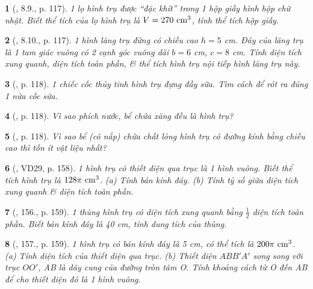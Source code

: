 \documentclass{article}
\newtheorem{baitoan}{}
\begin{document}
\begin{baitoan}[\cite{Binh_boi_duong_Toan_9_tap_2}, 8.9., p. 117]
	1 lọ hình trụ được ``đặc khít'' trong 1 hộp giấy hình hộp chữ nhật. Biết thể tích của lọ hình trụ là $V = 270\ {\rm cm}^3$, tính thể tích hộp giấy.
\end{baitoan}

\begin{baitoan}[\cite{Binh_boi_duong_Toan_9_tap_2}, 8.10., p. 117]
	1 hình lăng trụ đứng có chiều cao $h = 5$ {\rm cm}. Đáy của lăng trụ là 1 tam giác vuông có 2 cạnh góc vuông dài $b = 6$ {\rm cm}, $c = 8$ {\rm cm}. Tính diện tích xung quanh, diện tích toàn phần, \& thể tích hình trụ nội tiếp hình lăng trụ này.
\end{baitoan}

\begin{baitoan}[\cite{Binh_boi_duong_Toan_9_tap_2}, p. 118]
	1 chiếc cốc thủy tinh hình trụ đựng đầy sữa. Tìm cách để rót ra đúng 1 nửa cốc sữa.
\end{baitoan}

\begin{baitoan}[\cite{Binh_boi_duong_Toan_9_tap_2}, p. 118]
	Vì sao phích nước, bể chứa xăng đều là hình trụ?
\end{baitoan}

\begin{baitoan}[\cite{Binh_boi_duong_Toan_9_tap_2}, p. 118]
	Vì sao bể (có nắp) chứa chất lỏng hình trụ có đường kính bằng chiều cao thì tốn ít vật liệu nhất?
\end{baitoan}

\begin{baitoan}[\cite{Tuyen_Toan_9_old}, VD29, p. 158]
	1 hình trụ có thiết diện qua trục là 1 hình vuông. Biết thể tích hình trụ là $128\pi\ {\rm cm}^3$. (a) Tính bán kính đáy. (b) Tính tỷ số giữa diện tích xung quanh \& diện tích toàn phần.
\end{baitoan}

\begin{baitoan}[\cite{Tuyen_Toan_9_old}, 156., p. 159]
	1 thùng hình trụ có diện tích xung quanh bằng $\frac{1}{2}$ diện tích toàn phần. Biết bán kính đáy là {\rm40 cm}, tính dung tích của thùng.
\end{baitoan}

\begin{baitoan}[\cite{Tuyen_Toan_9_old}, 157., p. 159]
	1 hình trụ có bán kính đáy là {\rm5 cm}, có thể tích là $200\pi\ {\rm cm}^3$. (a) Tính diện tích của thiết diện qua trục. (b) Thiết diện $ABB'A'$ song song với trục $OO'$, AB là dây cung của đường tròn tâm O. Tính khoảng cách từ O đến AB để cho thiết diện đó là 1 hình vuông.
\end{baitoan}
\end{document}
